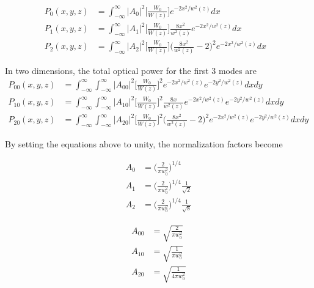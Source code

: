 \documentclass[oneside]{book}
\begin{document}
\begin{appendices}
	\begin{equation}
	\label{HGNormalInt1D}
	\begin{aligned}
		P_{0}(x,y,z) 	& 	=	\int_{-\infty}^{\infty}  \vert A_{0} \vert^2   \bigg[ \frac{W_0}{W(z)} \bigg] e^{-2x^2/w^2(z)} dx	&
	\\	P_{1}(x,y,z)	&	=	\int_{-\infty}^{\infty}  \vert A_{1} \vert^2  \bigg[ \frac{W_0}{W(z)} \bigg] \frac{8x^2}{w^2(z)} 	
								e^{-2x^2/w^2(z)}dx &
	\\	P_{2}(x,y,z)	&	= 	\int_{-\infty}^{\infty}  \vert A_{2} \vert^2   \bigg[ \frac{W_0}{W(z)} \bigg] \bigg(\frac{8x^2}{w^2(z)}	-2\bigg)^2e^{-2x^2/w^2(z)}dx
	\end{aligned}
	\end{equation}
	
	In two dimensions, the total optical power for the first 3 modes are
	\begin{equation}
	\label{HGNormalInt2D}
	\begin{aligned}
		P_{00}(x,y,z) 	& 	=	 \int_{-\infty}^{\infty} \int_{-\infty}^{\infty}  \vert A_{00} \vert^2   \bigg[ \frac{W_0}{W(z)} \bigg]^2 e^{-2x^2/w^2(z)}e^{-2y^2/w^2(z)} dx dy&
	\\	P_{10}(x,y,z)	&	=	\int_{-\infty}^{\infty} \int_{-\infty}^{\infty}  \vert A_{10} \vert^2  \bigg[ \frac{W_0}{W(z)} \bigg]^2 \frac{8x}{w^2(z)} e^{-2x^2/w^2(z)}e^{-2y^2/w^2(z)} dx dy&
	\\	P_{20}(x,y,z)	&	= 	\int_{-\infty}^{\infty} \int_{-\infty}^{\infty}  \vert A_{20} \vert^2   \bigg[ \frac{W_0}{W(z)} \bigg]^2 \bigg(\frac{8x^2}{w^2(z)} - 2\bigg)^2 e^{-2x^2/w^2(z)}e^{-2y^2/w^2(z)} dx dy
	\end{aligned}
	\end{equation}
	
	By setting the equations above to unity, the normalization factors become
	
	\begin{equation}
	\begin{aligned}
		A_{0} &	= \bigg( \frac{2}{\pi w_0^2} \bigg)^{1/4} 
	\\	A_{1} &	= \bigg( \frac{2}{\pi w_0^2} \bigg)^{1/4} \frac{1}{\sqrt{2}}
	\\	A_{2} &	= \bigg( \frac{2}{\pi w_0^2} \bigg)^{1/4} \frac{1}{\sqrt{8}}
	\end{aligned}
	\end{equation}
	
	\begin{equation}
	\begin{aligned}
		A_{00} &	= \sqrt{\frac{2}{\pi w_0^2}}
	\\	A_{10} &	= \sqrt{\frac{1}{\pi w_0^2}}
	\\	A_{20} &	= \sqrt{\frac{1}{4\pi w_0^2}}
	\end{aligned}
	\end{equation}
	

\end{appendices}
\end{document}
